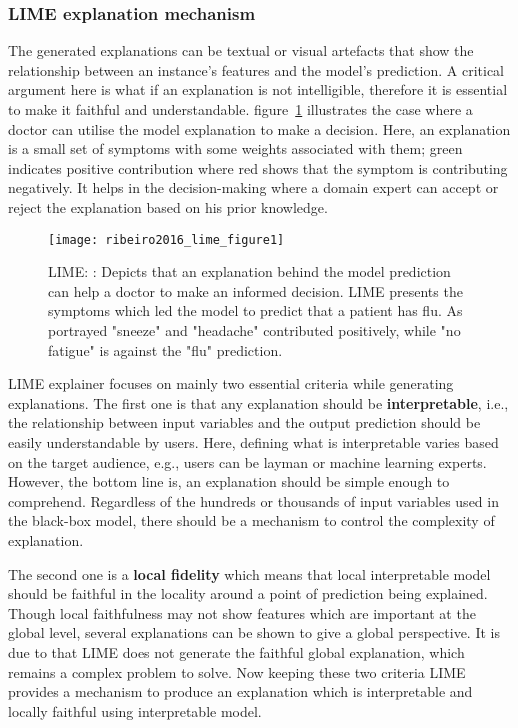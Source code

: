 \documentclass[english]{tktltiki2}
\theoremstyle{definition}
\theoremstyle{remark}
\begin{document}
\subsubsection{LIME explanation mechanism} %
The generated explanations can be textual or visual artefacts that show the relationship between an instance's features and the model's prediction. A critical argument here is what if an explanation is not intelligible, therefore it is essential to make it faithful and understandable. figure~\ref{fig:ribeiro2016_lime_figure1} illustrates the case where a doctor can utilise the model explanation to make a decision. Here, an explanation is a small set of symptoms with some weights associated with them; green indicates positive contribution where red shows that the symptom is contributing negatively. It helps in the decision-making where a domain expert can accept or reject the explanation based on his prior knowledge.

\begin{figure}[H]
	\texttt{[image: ribeiro2016\_lime\_figure1]}
	\vspace*{-10mm}
	\caption{LIME: \citep{ribeiro2016should}: Depicts that an explanation behind the model prediction can help a doctor to make an informed decision. LIME presents the symptoms which led the model to predict that a patient has flu. As portrayed "sneeze" and "headache" contributed positively, while "no fatigue" is against the "flu" prediction. }
	\label{fig:ribeiro2016_lime_figure1}
\end{figure}

LIME \citep{ribeiro2016should} explainer focuses on mainly two essential criteria while generating explanations. The first one is that any explanation should be \textbf{interpretable}, i.e., the relationship between input variables and the output prediction should be easily understandable by users. Here, defining what is interpretable varies based on the target audience, e.g., users can be layman or machine learning experts. However, the bottom line is, an explanation should be simple enough to comprehend. Regardless of the hundreds or thousands of input variables used in the black-box model, there should be a mechanism to control the complexity of explanation.

The second one is a \textbf{local fidelity} which means that local interpretable model should be faithful in the locality around a point of prediction being explained. Though local faithfulness may not show features which are important at the global level, several explanations can be shown to give a global perspective. It is due to that LIME does not generate the faithful global explanation, which remains a complex problem to solve. Now keeping these two criteria LIME \citep{ribeiro2016should} provides a mechanism to produce an explanation which is interpretable and locally faithful using interpretable model.
\end{document}

